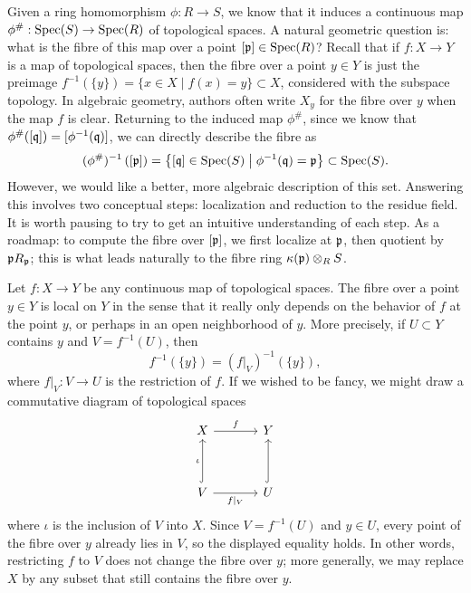 \documentclass[12pt,reqno]{amsart}
\begin{document}
\hrulefill


Given a ring homomorphism $\phi:R \to S$, we know that it induces a continuous map $\phi^{\#}: \operatorname{Spec}(S) \to \operatorname{Spec}(R)$ of topological spaces. A natural geometric question is: what is the fibre of this map over a point $[\mathfrak{p}] \in \operatorname{Spec}(R)$? Recall that if $f:X \to Y$ is a map of topological spaces, then the fibre over a point $y \in Y$ is just the preimage $f^{-1}(\{y\})=\{x \in X \mid f(x)=y\} \subset X$, considered with the subspace topology. In algebraic geometry, authors often write $X_y$ for the fibre over $y$ when the map $f$ is clear. Returning to the induced map $\phi^{\#}$, since we know that $\phi^{\#}([\mathfrak{q}])=[\phi^{-1}(\mathfrak{q})]$, we can directly describe the fibre as
\[
(\phi^{\#})^{-1}\left([\mathfrak{p}]\right) = \left\{ [\mathfrak{q}] \in \operatorname{Spec}(S) \;\middle|\; \phi^{-1}(\mathfrak{q})=\mathfrak{p} \right\} \subset \operatorname{Spec}(S).
\]
However, we would like a better, more algebraic description of this set. Answering this involves two conceptual steps: localization and reduction to the residue field. It is worth pausing to try to get an intuitive understanding of each step. As a roadmap: to compute the fibre over $[\mathfrak{p}]$, we first localize at $\mathfrak{p}$, then quotient by $\mathfrak{p} R_{\mathfrak{p}}$; this is what leads naturally to the fibre ring $\kappa(\mathfrak{p})\otimes_R S$.

Let $f:X \to Y$ be any continuous map of topological spaces. The fibre over a point $y \in Y$ is local on $Y$ in the sense that it really only depends on the behavior of $f$ at the point $y$, or perhaps in an open neighborhood of $y$. More precisely, if $U \subset Y$ contains $y$ and $V=f^{-1}(U)$, then
\[
f^{-1}(\{y\}) = (f|_{V})^{-1}(\{y\}),
\]
where $f|_{V}:V \to U$ is the restriction of $f$. If we wished to be fancy, we might draw a commutative diagram of topological spaces
\[
\begin{tikzcd}[row sep = 3.5em, column sep =3.5em]
	X \arrow[r, "f"] & Y \\
	V \arrow[u, hookrightarrow, "\iota"] \arrow[r, swap,"f|_{V}"] & U \arrow[u, hookrightarrow]
\end{tikzcd}
\]
where $\iota$ is the inclusion of $V$ into $X$. Since $V=f^{-1}(U)$ and $y\in U$, every point of the fibre over $y$ already lies in $V$, so the displayed equality holds. In other words, restricting $f$ to $V$ does not change the fibre over $y$; more generally, we may replace $X$ by any subset that still contains the fibre over $y$.
\end{document}
